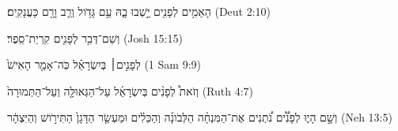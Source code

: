 
\begin{exe}

\ex\label{ant_formerly_exs1}
\texthebrew{
הָאֵמִ֥ים לְפָנִ֖ים יָ֣שְׁבוּ בָ֑הּ עַ֣ם גָּדֹ֥ול וְרַ֛ב וָרָ֖ם כָּעֲנָקִֽים׃ 
} (Deut 2:10)

\ex\label{ant_formerly_exs2}
\texthebrew{
וְשֵׁם־דְּבִ֥ר לְפָנִ֖ים קִרְיַת־סֵֽפֶר׃ 
} (Josh 15:15)

\ex\label{ant_formerly_exs3}
\texthebrew{
לְפָנִ֣ים׀ בְּיִשְׂרָאֵ֗ל כֹּֽה־אָמַ֤ר הָאִישׁ֙ 
} (1 Sam 9:9)

\ex\label{ant_formerly_exs4}
\texthebrew{
וְזֹאת֩ לְפָנִ֨ים בְּיִשְׂרָאֵ֜ל עַל־הַגְּאוּלָּ֤ה וְעַל־הַתְּמוּרָה֙ 
} (Ruth 4:7)

\ex\label{ant_formerly_exs5}
\texthebrew{
וְשָׁ֣ם הָי֪וּ לְפָנִ֟ים נֹ֠תְנִים אֶת־הַמִּנְחָ֨ה הַלְּבֹונָ֜ה וְהַכֵּלִ֗ים וּמַעְשַׂ֤ר הַדָּגָן֙ הַתִּירֹ֣ושׁ וְהַיִּצְהָ֔ר 
} (Neh 13:5)

\end{exe}
